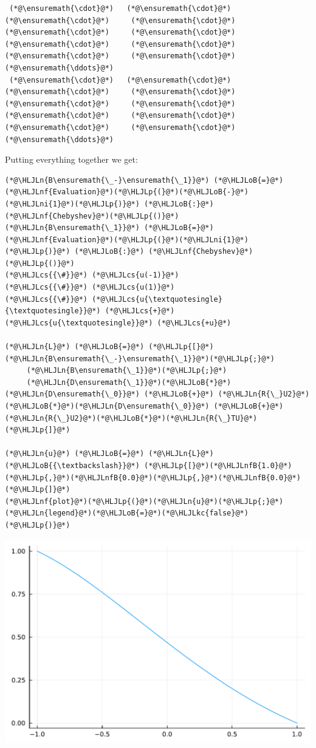 \documentclass[12pt,a4paper]{article}
\newcommand{\HLJLkc}[1]{\textcolor[RGB]{59,151,46}{\textit{#1}}}
\newcommand{\HLJLn}[1]{#1}
\newcommand{\HLJLnf}[1]{\textcolor[RGB]{66,102,213}{#1}}
\newcommand{\HLJLnfB}[1]{\textcolor[RGB]{59,151,46}{#1}}
\newcommand{\HLJLni}[1]{\textcolor[RGB]{59,151,46}{#1}}
\newcommand{\HLJLoB}[1]{\textcolor[RGB]{102,102,102}{\textbf{#1}}}
\newcommand{\HLJLp}[1]{#1}
\newcommand{\HLJLcs}[1]{\textcolor[RGB]{153,153,119}{\textit{#1}}}
\begin{document}
\begin{lstlisting}
 (*@\ensuremath{\cdot}@*)   (*@\ensuremath{\cdot}@*)    (*@\ensuremath{\cdot}@*)     (*@\ensuremath{\cdot}@*)     (*@\ensuremath{\cdot}@*)     (*@\ensuremath{\cdot}@*)     (*@\ensuremath{\cdot}@*)     (*@\ensuremath{\cdot}@*)     (*@\ensuremath{\cdot}@*)     (*@\ensuremath{\cdot}@*)   (*@\ensuremath{\ddots}@*)
 (*@\ensuremath{\cdot}@*)   (*@\ensuremath{\cdot}@*)    (*@\ensuremath{\cdot}@*)     (*@\ensuremath{\cdot}@*)     (*@\ensuremath{\cdot}@*)     (*@\ensuremath{\cdot}@*)     (*@\ensuremath{\cdot}@*)     (*@\ensuremath{\cdot}@*)     (*@\ensuremath{\cdot}@*)     (*@\ensuremath{\cdot}@*)   (*@\ensuremath{\ddots}@*)
\end{lstlisting}


Putting everything together we get:


\begin{lstlisting}
(*@\HLJLn{B\ensuremath{\_-}\ensuremath{\_1}}@*) (*@\HLJLoB{=}@*) (*@\HLJLnf{Evaluation}@*)(*@\HLJLp{(}@*)(*@\HLJLoB{-}@*)(*@\HLJLni{1}@*)(*@\HLJLp{)}@*) (*@\HLJLoB{:}@*) (*@\HLJLnf{Chebyshev}@*)(*@\HLJLp{()}@*)
(*@\HLJLn{B\ensuremath{\_1}}@*) (*@\HLJLoB{=}@*) (*@\HLJLnf{Evaluation}@*)(*@\HLJLp{(}@*)(*@\HLJLni{1}@*)(*@\HLJLp{)}@*) (*@\HLJLoB{:}@*) (*@\HLJLnf{Chebyshev}@*)(*@\HLJLp{()}@*)
(*@\HLJLcs{{\#}}@*) (*@\HLJLcs{u(-1)}@*)
(*@\HLJLcs{{\#}}@*) (*@\HLJLcs{u(1)}@*)
(*@\HLJLcs{{\#}}@*) (*@\HLJLcs{u{\textquotesingle}{\textquotesingle}}@*) (*@\HLJLcs{+}@*) (*@\HLJLcs{u{\textquotesingle}}@*) (*@\HLJLcs{+u}@*)

(*@\HLJLn{L}@*) (*@\HLJLoB{=}@*) (*@\HLJLp{[}@*)(*@\HLJLn{B\ensuremath{\_-}\ensuremath{\_1}}@*)(*@\HLJLp{;}@*)
     (*@\HLJLn{B\ensuremath{\_1}}@*)(*@\HLJLp{;}@*)
     (*@\HLJLn{D\ensuremath{\_1}}@*)(*@\HLJLoB{*}@*)(*@\HLJLn{D\ensuremath{\_0}}@*) (*@\HLJLoB{+}@*) (*@\HLJLn{R{\_}U2}@*)(*@\HLJLoB{*}@*)(*@\HLJLn{D\ensuremath{\_0}}@*) (*@\HLJLoB{+}@*) (*@\HLJLn{R{\_}U2}@*)(*@\HLJLoB{*}@*)(*@\HLJLn{R{\_}TU}@*)(*@\HLJLp{]}@*)

(*@\HLJLn{u}@*) (*@\HLJLoB{=}@*) (*@\HLJLn{L}@*) (*@\HLJLoB{{\textbackslash}}@*) (*@\HLJLp{[}@*)(*@\HLJLnfB{1.0}@*)(*@\HLJLp{,}@*)(*@\HLJLnfB{0.0}@*)(*@\HLJLp{,}@*)(*@\HLJLnfB{0.0}@*)(*@\HLJLp{]}@*)
(*@\HLJLnf{plot}@*)(*@\HLJLp{(}@*)(*@\HLJLn{u}@*)(*@\HLJLp{;}@*)(*@\HLJLn{legend}@*)(*@\HLJLoB{=}@*)(*@\HLJLkc{false}@*)(*@\HLJLp{)}@*)
\end{lstlisting}

\includegraphics[width=\linewidth]{jl_hpkPoK/OP_methods_test_41_1.pdf}
\end{document}
